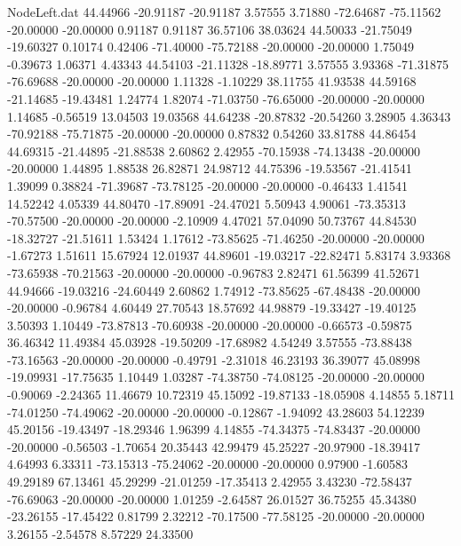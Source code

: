 \begin{filecontents}{NodeLeft.dat}
  44.44966  -20.91187  -20.91187     3.57555    3.71880  -72.64687  -75.11562  -20.00000  -20.00000    0.91187    0.91187   36.57106   38.03624
  44.50033  -21.75049  -19.60327     0.10174    0.42406  -71.40000  -75.72188  -20.00000  -20.00000    1.75049   -0.39673    1.06371    4.43343
  44.54103  -21.11328  -18.89771     3.57555    3.93368  -71.31875  -76.69688  -20.00000  -20.00000    1.11328   -1.10229   38.11755   41.93538
  44.59168  -21.14685  -19.43481     1.24774    1.82074  -71.03750  -76.65000  -20.00000  -20.00000    1.14685   -0.56519   13.04503   19.03568
  44.64238  -20.87832  -20.54260     3.28905    4.36343  -70.92188  -75.71875  -20.00000  -20.00000    0.87832    0.54260   33.81788   44.86454
  44.69315  -21.44895  -21.88538     2.60862    2.42955  -70.15938  -74.13438  -20.00000  -20.00000    1.44895    1.88538   26.82871   24.98712
  44.75396  -19.53567  -21.41541     1.39099    0.38824  -71.39687  -73.78125  -20.00000  -20.00000   -0.46433    1.41541   14.52242    4.05339
  44.80470  -17.89091  -24.47021     5.50943    4.90061  -73.35313  -70.57500  -20.00000  -20.00000   -2.10909    4.47021   57.04090   50.73767
  44.84530  -18.32727  -21.51611     1.53424    1.17612  -73.85625  -71.46250  -20.00000  -20.00000   -1.67273    1.51611   15.67924   12.01937
  44.89601  -19.03217  -22.82471     5.83174    3.93368  -73.65938  -70.21563  -20.00000  -20.00000   -0.96783    2.82471   61.56399   41.52671
  44.94666  -19.03216  -24.60449     2.60862    1.74912  -73.85625  -67.48438  -20.00000  -20.00000   -0.96784    4.60449   27.70543   18.57692
  44.98879  -19.33427  -19.40125     3.50393    1.10449  -73.87813  -70.60938  -20.00000  -20.00000   -0.66573   -0.59875   36.46342   11.49384
  45.03928  -19.50209  -17.68982     4.54249    3.57555  -73.88438  -73.16563  -20.00000  -20.00000   -0.49791   -2.31018   46.23193   36.39077
  45.08998  -19.09931  -17.75635     1.10449    1.03287  -74.38750  -74.08125  -20.00000  -20.00000   -0.90069   -2.24365   11.46679   10.72319
  45.15092  -19.87133  -18.05908     4.14855    5.18711  -74.01250  -74.49062  -20.00000  -20.00000   -0.12867   -1.94092   43.28603   54.12239
  45.20156  -19.43497  -18.29346     1.96399    4.14855  -74.34375  -74.83437  -20.00000  -20.00000   -0.56503   -1.70654   20.35443   42.99479
  45.25227  -20.97900  -18.39417     4.64993    6.33311  -73.15313  -75.24062  -20.00000  -20.00000    0.97900   -1.60583   49.29189   67.13461
  45.29299  -21.01259  -17.35413     2.42955    3.43230  -72.58437  -76.69063  -20.00000  -20.00000    1.01259   -2.64587   26.01527   36.75255
  45.34380  -23.26155  -17.45422     0.81799    2.32212  -70.17500  -77.58125  -20.00000  -20.00000    3.26155   -2.54578    8.57229   24.33500

\end{filecontents}
